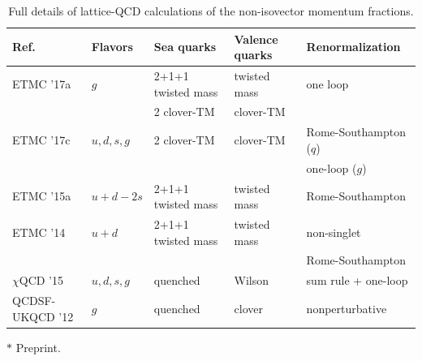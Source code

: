 \begin{table}[!t]
\renewcommand{\arraystretch}{1.2} 
\centering
\footnotesize
\begin{threeparttable}
\begin{tabular}{lllll}
\toprule
Ref. & Flavors & Sea quarks & Valence quarks & Renormalization \\
\midrule

  ETMC '17a \cite{Alexandrou:2016ekb} & $g$
    & 2+1+1 twisted mass & twisted mass & one loop \\
  & & 2 clover-TM & clover-TM & \\

  ETMC '17c \cite{Alexandrou:2017oeh} & $u,d,s,g$
    & 2 clover-TM & clover-TM & Rome-Southampton ($q$)\\
    & & & & one-loop ($g$)\\   
 
  ETMC '15a \cite{Alexandrou:2015qia} &
  $u+d-2s$ &  2+1+1 twisted mass & twisted mass & Rome-Southampton \\

  ETMC '14 \cite{Abdel-Rehim:2013wlz} &
  $u+d$ & 2+1+1 twisted mass & twisted mass & non-singlet\\ 
  & & & & Rome-Southampton\\

  $\chi$QCD '15 \cite{Deka:2013zha} &
  $u,d,s,g$ & quenched & Wilson & sum rule + one-loop \\

  QCDSF-UKQCD '12 \cite{Horsley:2012pz} &
  $g$ & quenched & clover & nonperturbative \\
\bottomrule
\end{tabular}
\begin{tablenotes}
\scriptsize
\item[$*$] Preprint.
\end{tablenotes}
\end{threeparttable}
\caption{\small Full details of lattice-QCD calculations of the non-isovector 
momentum fractions.}
\label{tab:nonisovectormomfrac}
\end{table}


